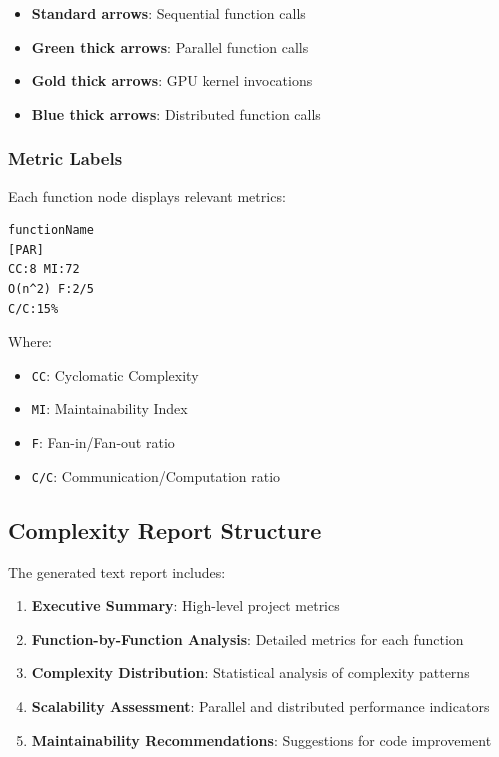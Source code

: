 \documentclass[11pt,a4paper]{article}
\begin{document}
\begin{itemize}
    \item \textbf{Standard arrows}: Sequential function calls
    \item \textbf{Green thick arrows}: Parallel function calls
    \item \textbf{Gold thick arrows}: GPU kernel invocations
    \item \textbf{Blue thick arrows}: Distributed function calls
\end{itemize}

\subsubsection{Metric Labels}

Each function node displays relevant metrics:

\begin{lstlisting}[style=chapel, caption=Example Node Label]
functionName
[PAR]
CC:8 MI:72
O(n^2) F:2/5
C/C:15%
\end{lstlisting}

Where:
\begin{itemize}
    \item \texttt{CC}: Cyclomatic Complexity
    \item \texttt{MI}: Maintainability Index
    \item \texttt{F}: Fan-in/Fan-out ratio
    \item \texttt{C/C}: Communication/Computation ratio
\end{itemize}

\subsection{Complexity Report Structure}

The generated text report includes:

\begin{enumerate}
    \item \textbf{Executive Summary}: High-level project metrics
    \item \textbf{Function-by-Function Analysis}: Detailed metrics for each function
    \item \textbf{Complexity Distribution}: Statistical analysis of complexity patterns
    \item \textbf{Scalability Assessment}: Parallel and distributed performance indicators
    \item \textbf{Maintainability Recommendations}: Suggestions for code improvement
\end{enumerate}
\end{document}
